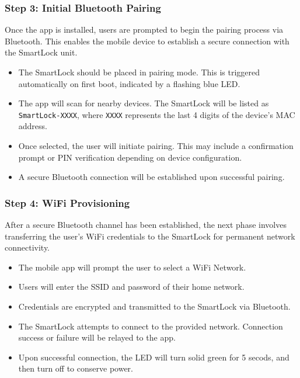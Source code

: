 \subsubsection{Step 3: Initial Bluetooth Pairing}

Once the app is installed, users are prompted to begin the pairing process via Bluetooth. This enables the mobile device to establish a secure connection with the SmartLock unit.

\begin{itemize}
    \item The SmartLock should be placed in pairing mode. This is triggered automatically on first boot, indicated by a flashing blue LED.
    \item The app will scan for nearby devices. The SmartLock will be listed as \texttt{SmartLock-XXXX}, where \texttt{XXXX} represents the last 4 digits of the device's MAC address.
    \item Once selected, the user will initiate pairing. This may include a confirmation prompt or PIN verification depending on device configuration.
    \item A secure Bluetooth connection will be established upon successful pairing.
\end{itemize}

\subsubsection{Step 4: WiFi Provisioning}

After a secure Bluetooth channel has been established, the next phase involves transferring the user's WiFi credentials to the SmartLock for permanent network connectivity.

\begin{itemize}
    \item The mobile app will prompt the user to select a WiFi Network.
    \item Users will enter the SSID and password of their home network.
    \item Credentials are encrypted and transmitted to the SmartLock via Bluetooth.
    \item The SmartLock attempts to connect to the provided network. Connection success or failure will be relayed to the app.
    \item Upon successful connection, the LED will turn solid green for 5 secods, and then turn off to conserve power.
\end{itemize}

